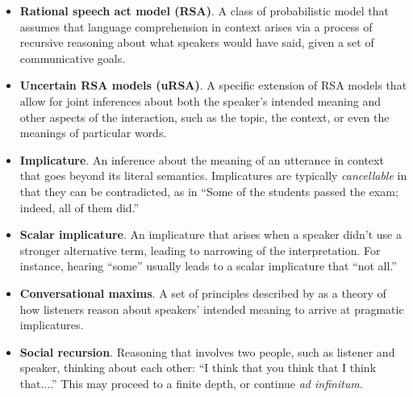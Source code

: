 \documentclass[]{elsarticle}
\begin{document}
\begin{itemize}
\item \textbf{Rational speech act model (RSA)}. A class of probabilistic model that assumes that language comprehension in context arises via a process of recursive reasoning about what speakers would have said, given a set of communicative goals.

\item \textbf{Uncertain RSA models (uRSA)}. A specific extension of RSA models that allow for joint inferences about both the speaker's intended meaning and other aspects of the interaction, such as the topic, the context, or even the meanings of particular words.

\item \textbf{Implicature}. An inference about the meaning of an utterance in context that goes beyond its literal semantics. Implicatures are typically \emph{cancellable} in that they can be contradicted, as in ``Some of the students passed the exam; indeed, all of them did.''

\item \textbf{Scalar implicature}. An implicature that arises when a speaker didn't use a stronger alternative term, leading to narrowing of the interpretation. For instance, hearing ``some'' usually leads to a scalar implicature that ``not all.''

\item \textbf{Conversational maxims}. A set of principles described by \citet{grice1975} as a theory of how listeners reason about speakers' intended meaning to arrive at pragmatic implicatures.

\item \textbf{Social recursion}. Reasoning that involves two people, such as listener and speaker, thinking about each other: ``I think that you think that I think that....'' This may proceed to a finite depth, or continue \emph{ad infinitum}.

\end{itemize}




\end{document}
